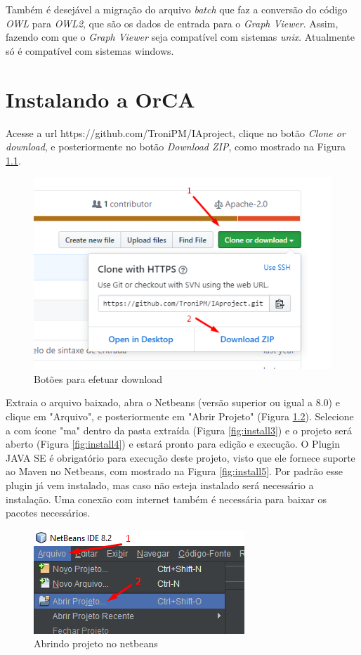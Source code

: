 \documentclass{bcc}
\begin{document}
Também é desejável a migração do arquivo \textit{batch} que faz a conversão do código \textit{OWL} para \textit{OWL2}, que são os dados de entrada para o \textit{Graph Viewer}. Assim, fazendo com que o \textit{Graph Viewer} seja compatível com sistemas \textit{unix}. Atualmente só é compatível com sistemas windows.





\appendix
\chapter{Instalando a OrCA}
\label{chap:apInstalacao}
Acesse a url https://github.com/TroniPM/IAproject, clique no botão \textit{Clone or download}, e posteriormente no botão \textit{Download ZIP}, como mostrado na Figura \ref{fig:install1}.

\begin{figure}[H]
\centering
\includegraphics[width=.7\textwidth]{Figuras/install1.png}
\caption{Botões para efetuar download} 
\label{fig:install1}
\end{figure}

Extraia o arquivo baixado, abra o Netbeans (versão superior ou igual a 8.0) e clique em "Arquivo", e posteriormente em "Abrir Projeto" (Figura \ref{fig:install2}). Selecione a com ícone "ma" dentro da pasta extraída (Figura \ref{fig:install3}) e o projeto será aberto (Figura \ref{fig:install4}) e estará pronto para edição e execução. O Plugin JAVA SE é obrigatório para execução deste projeto, visto que ele fornece suporte ao Maven no Netbeans, com mostrado na Figura \ref{fig:install5}. Por padrão esse plugin já vem instalado, mas caso não esteja instalado será necessário a instalação. Uma conexão com internet também é necessária para baixar os pacotes necessários.

\begin{figure}[H]
\centering
\includegraphics[width=.7\textwidth]{Figuras/install2.png}
\caption{Abrindo projeto no netbeans} 
\label{fig:install2}
\end{figure}
\end{document}
